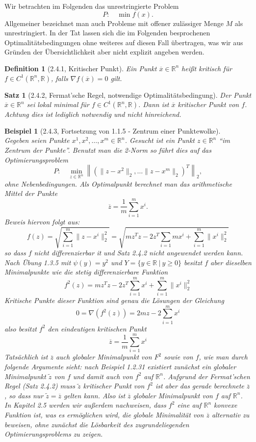 \documentclass[12pt]{extreport} %
\newcommand{\R}{\mathbb{R}}
\theoremstyle{named}
\theoremstyle{nnamed}
\theoremstyle{itshape}
\newtheorem*{satz}{Satz}
\newtheorem*{definition}{Definition}
\theoremstyle{normal}
\newtheorem*{beispiel}{Beispiel}
\begin{document}
Wir betrachten im Folgenden das unrestringierte Problem 
$$ P: \quad \min f(x). $$
Allgemeiner bezeichnet man auch Probleme mit offener zulässiger Menge $M$ als unrestringiert. In der Tat lassen sich die im Folgenden besprochenen Optimalitätsbedingungen ohne weiteres auf diesen Fall übertragen, was wir aus Gründen der Übersichtlichkeit aber nicht explizit angeben werden.

\begin{definition}[2.4.1, Kritischer Punkt]
	Ein Punkt $\overline{x} \in \R^n$ heißt kritisch für $f \in C^1(\R^n, \R)$, falls $\nabla f(\overline{x}) = 0$ gilt.	
\end{definition}

\begin{satz}[2.4.2, Fermat'sche Regel, notwendige Optimalitätsbedingung]
	Der Punkt $\overline{x} \in \R^n$ sei lokal minimal für $f \in C^1(\R^n, \R)$. Dann ist $\overline{x}$ kritischer Punkt von $f$. Achtung dies ist lediglich notwendig und nicht hinreichend.
\end{satz}


\begin{beispiel}[2.4.3, Fortsetzung von 1.1.5 - Zentrum einer Punktewolke] ~\\
	Gegeben seien Punkte $x^1, x^2, \dotsc, x^m \in \R^n$. Gesucht ist ein Punkt $z \in \R^n$ \enquote{im Zentrum der Punkte}. Benutzt man die 2-Norm so führt dies auf das Optimierungsproblem
		$$ P: \quad \min_{z \in \R^n} \left\| \left( \| z - x^2 \|_2, \dotsc \| z - x^m \|_2 \right)^T \right\|_2, $$
	ohne Nebenbedingungen. Als Optimalpunkt berechnet man das arithmetische Mittel der Punkte
	$$ \overline{z} = \frac{1}{m} \sum_{i=1}^m x^i. $$
	Beweis hiervon folgt aus:
	$$ f(z) = \sqrt{ \sum_{i=1}^{m} \| z - x^i \|_2^2} = \sqrt{ m z^T z - 2 z^T \sum_{i=1}{m} x^i + \sum_{i=1}^{m} \| x^i \|_2^2} $$
	so dass $f$ nicht differenzierbar it und Satz 2.4.2 nicht angewendet werden kann. Nach Übung 1.3.5 mit $\psi(y) = y^2$ und $Y = \{ y \in \R ~|~y \geq 0  \}$ besitzt $f$ aber dieselben Minimalpunkte wie die stetig differenzierbare Funktion
	$$ f^2(z) = mz^Tz - 2z^T \sum_{i=1}^{m} x^i + \sum_{i=1}^{m} \| x^i \|_2^2 $$
	Kritische Punkte dieser Funktion sind genau die Lösungen der Gleichung 
	$$ 0 = \nabla \left( f^2(z) \right) = 2 mz - 2 \sum_{i=1}^m x^i $$
	also besitzt $f^2$ den eindeutigen kritischen Punkt
	$$ \overline{z} = \frac{1}{m} \sum_{i=1}^{m} x^i $$
	Tatsächlich ist $\overline{z}$ auch globaler Minimalpunkt von $F^2$ sowie von $f$, wie man durch folgende Argumente sieht: nach Beispiel 1.2.31 existiert zunächst ein globaler Minimalpunkt $\tilde{z}$ von $f$ und damit auch von $f^2$ auf $\R^n$. Aufgrund der Fermat'schen Regel (Satz 2.4.2) muss $\tilde{z}$ kritischer Punkt von $f^2$ ist aber das gerade berechnete $\overline{z}$, so dass nur $\tilde{z} = \overline{z}$ gelten kann. Also ist $\overline{z}$ globaler Minimalpunkt von $f$ auf $\R^n$. ~\\
	
	In Kapitel 2.5 werden wir außerdem nachweisen, dass $f^2$ eine auf $\R^n$ konvexe Funktion ist, was es ermöglichen wird, die globale Minimalität von $\overline{z}$ alternativ zu beweisen, ohne zunächst die Lösbarkeit des zugrundeliegenden Optimierungsproblems zu zeigen.
\end{beispiel}
\end{document}
